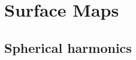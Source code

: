 \documentclass[modern]{aastex61}
\begin{document}
\section{Surface Maps}
\label{sec:surfacemaps}

\subsection{Spherical harmonics}
\label{sec:spharm}
\end{document}
